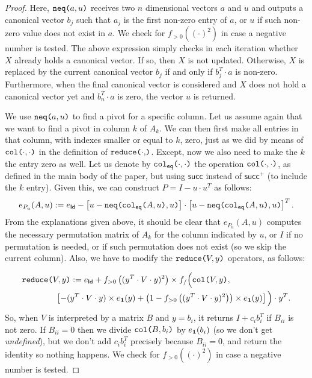 \begin{proof}
    Here, $\texttt{neq(}a,u\texttt{)}$ receives two $n$ dimensional vectors $a$ and $u$ and outputs a 
    canonical vector $b_j$ such that $a_j$ is the first non-zero entry of $a$, or $u$ if such non-zero value does not exist in $a$. We check for $f_{>0}((\cdot)^2)$ 
    in case a negative number is tested. The above expression simply checks in each iteration
    whether $X$ already holds a canonical vector. If so, then $X$ is not updated. Otherwise,
    $X$ is replaced by the current canonical vector $b_j$ if and only if $b_j^T\cdot a$ is non-zero. Furthermore, when the final canonical vector is considered and $X$ does not hold
    a canonical vector yet and $b_n^T\cdot a$ is zero, the vector $u$ is returned.

    We use $\texttt{neq(}a,u\texttt{)}$ to find a pivot for a specific column. Let us assume again that we
    want to find a pivot in column $k$ of $A_k$. We can then first make all entries in that column, with indexes smaller or equal to $k$, zero, just as we did by means of $\texttt{col(}\cdot,\cdot\texttt{)}$ in the
    definition of $\red{\cdot}$. Except, now we also need to make the $k$the entry zero as well.
    Let us denote by $\texttt{col}_{\texttt{eq}}\texttt{(}\cdot,\cdot\texttt{)}$ the operation $\texttt{col(}\cdot,\cdot\texttt{)}$, as defined in the main body of the paper, but using $\mathsf{succ}$ instead of $\mathsf{succ}^+$ (to include the $k$ entry). Given this, we can construct $P=I-u\cdot u^T$ as follows:
    $$
    e_{P_u}(A,u) := e_{\mathsf{Id}} - \left[ u - \texttt{neq(} \texttt{col}_{\texttt{eq}}\texttt{(}A,u\texttt{)} ,u\texttt{)} \right]\cdot \left[ u - \texttt{neq(} \texttt{col}_{\texttt{eq}}\texttt{(}A,u\texttt{)} ,u\texttt{)} \right]^T.
    $$ 
    From the explanations given above, it should be clear that $e_{P_u}(A,u)$ computes the necessary permutation matrix of $A_k$ for the column indicated by $u$, or $I$
    if no permutation is needed, or if such permutation does not exist (so we skip the current column). Also, we have to modify the $\texttt{reduce(}V,y\texttt{)}$ operators, as follows:

    \begin{align*}
        &\texttt{reduce(}V,y\texttt{)}:= e_{\mathsf{Id}}+ f_{>0}\left( ( y^T\cdot V\cdot y)^2 \right)\times f_/\Big(\texttt{col(}V,y\texttt{)}, \\
        &\hspace{4em}\left[ -(y^T\cdot V\cdot y)\times e_{\mathbf{1}}(y) + \left( 1 - f_{>0}\left( ( y^T\cdot V\cdot y)^2 \right) \right)\times e_{\mathbf{1}}(y) \right]\Big)\cdot y^T. \\
    \end{align*}
    So, when $V$ is interpreted by a matrix $B$ and $y=b_i$, it returns $I+c_ib_i^T$ if $B_{ii}$ is not zero. 
    If $B_{ii}=0$ then we divide $\texttt{col(}B,b_i\texttt{)}$ by $e_{\mathbf{1}}(b_i)$ (so we don't get \textit{undefined}), 
    but we don't add $c_ib_i^T$ precisely because $B_{ii}=0$, and return the identity so nothing happens. We check 
    for $f_{>0}((\cdot)^2)$ in case a negative number is tested.


\end{proof}
